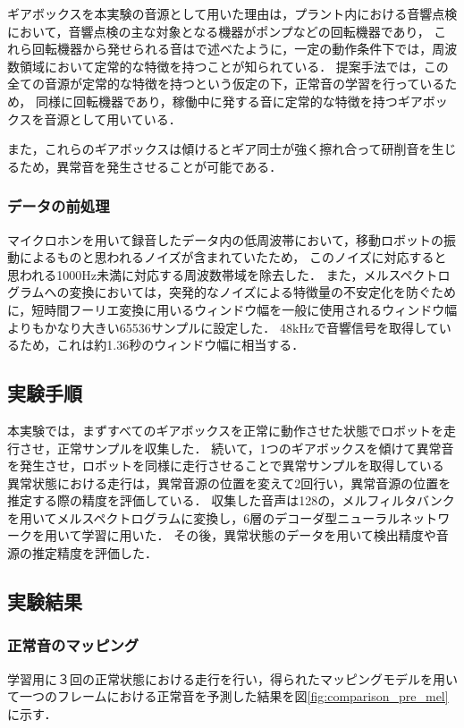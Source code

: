 \documentclass[../main]{subfiles}
\begin{document}
ギアボックスを本実験の音源として用いた理由は，プラント内における音響点検において，音響点検の主な対象となる機器がポンプなどの回転機器であり，
これら回転機器から発せられる音はで述べたように，一定の動作条件下では，周波数領域において定常的な特徴を持つことが知られている．
提案手法では，この全ての音源が定常的な特徴を持つという仮定の下，正常音の学習を行っているため，
同様に回転機器であり，稼働中に発する音に定常的な特徴を持つギアボックスを音源として用いている．

また，これらのギアボックスは傾けるとギア同士が強く擦れ合って研削音を生じるため，異常音を発生させることが可能である．
\subsubsection{データの前処理} \label{subsec:data_preprocessing}
マイクロホンを用いて録音したデータ内の低周波帯において，移動ロボットの振動によるものと思われるノイズが含まれていたため，
このノイズに対応すると思われる1000Hz未満に対応する周波数帯域を除去した．
また，メルスペクトログラムへの変換においては，突発的なノイズによる特徴量の不安定化を防ぐために，短時間フーリエ変換に用いるウィンドウ幅を一般に使用されるウィンドウ幅よりもかなり大きい65536サンプルに設定した．
48kHzで音響信号を取得しているため，これは約1.36秒のウィンドウ幅に相当する．
\subsection{実験手順} \label{subsec:experiment_procedure}

本実験では，まずすべてのギアボックスを正常に動作させた状態でロボットを走行させ，正常サンプルを収集した．
続いて，1つのギアボックスを傾けて異常音を発生させ，ロボットを同様に走行させることで異常サンプルを取得している
異常状態における走行は，異常音源の位置を変えて2回行い，異常音源の位置を推定する際の精度を評価している．
収集した音声は128の，メルフィルタバンクを用いてメルスペクトログラムに変換し，6層のデコーダ型ニューラルネットワークを用いて学習に用いた．
その後，異常状態のデータを用いて検出精度や音源の推定精度を評価した．


\subsection{実験結果} \label{subsec:vexp_ref_result}

\subsubsection{正常音のマッピング} \label{subsubsec:normal_mapping}
学習用に３回の正常状態における走行を行い，得られたマッピングモデルを用いて一つのフレームにおける正常音を予測した結果を図\ref{fig:comparison_pre_mel}に示す．
\end{document}
